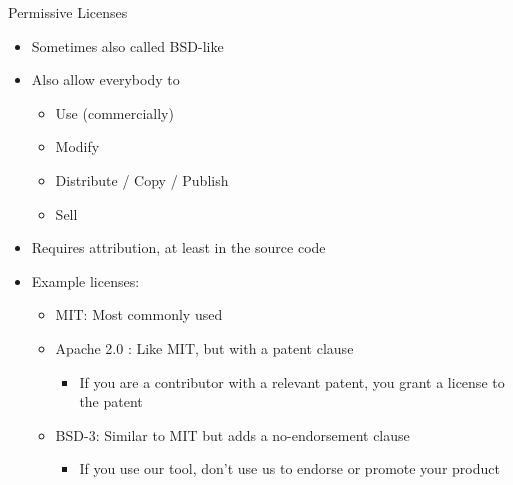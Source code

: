 \documentclass[compress,aspectratio=169]{beamer}
\begin{document}
  \begin{frame}{Permissive Licenses}
    \begin{itemize}
      \item Sometimes also called BSD-like \cite{guide}
      \item Also allow everybody to
        \begin{itemize}
          \item Use (commercially)
          \item Modify
          \item Distribute / Copy / Publish
          \item Sell
        \end{itemize}
      \item Requires attribution, at least in the source code
      \item Example licenses:
        \begin{itemize}
          \item MIT: Most commonly used
          \item Apache 2.0 \cite{apache2}: Like MIT, but with a patent clause \cite{apachefaq}
            \begin{itemize}
              \item If you are a contributor with a relevant patent, you grant a license to the patent
            \end{itemize}
          \item BSD-3: Similar to MIT but adds a no-endorsement clause
            \begin{itemize}
              \item If you use our tool, don't use us to endorse or promote your product
            \end{itemize}
        \end{itemize}
    \end{itemize}
  \end{frame}
\end{document}
